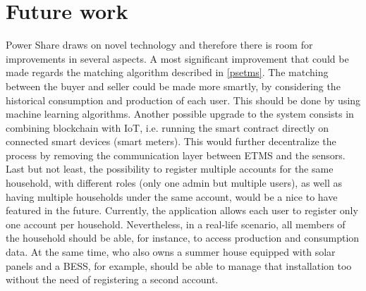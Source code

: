 \section{Future work} 


Power Share draws on novel technology and therefore there is room for improvements in several aspects. A most significant improvement that could be made regards the matching algorithm described in \cref{psetms}. The matching between the buyer and seller could be made more smartly, by considering the historical consumption and production of each user. This should be done by using machine learning algorithms. Another possible upgrade to the system consists in combining blockchain with \ac{IoT}, i.e. running the smart contract directly on connected smart devices (smart meters). This would further decentralize the process by removing the communication layer between \ac{ETMS} and the sensors.
Last but not least, the possibility to register multiple accounts for the same household, with different roles (only one admin but multiple users), as well as having multiple households under the same account, would be a nice to have featured in the future. Currently, the application allows each user to register only one account per household. Nevertheless, in a real-life scenario, all members of the household should be able, for instance, to access production and consumption data. At the same time, who also owns a summer house equipped with solar panels and a \ac{BESS}, for example, should be able to manage that installation too without the need of registering a second account. 



